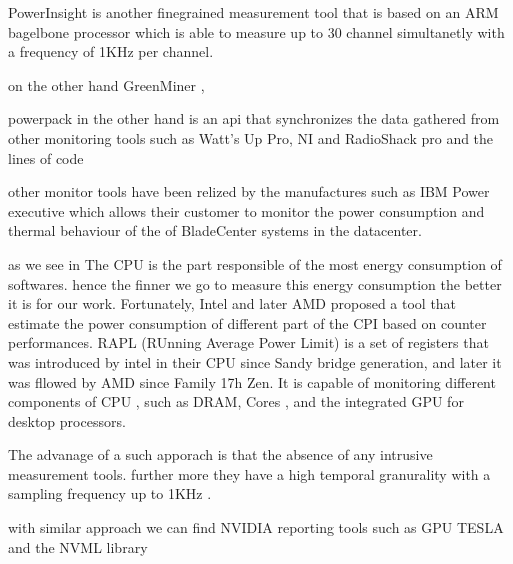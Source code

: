 PowerInsight \cite{laros2013powerinsight} is another finegrained measurement tool that is based on an ARM bagelbone processor \cite{coley2012beaglebone} which is able to measure up to 30 channel simultanetly with a frequency of 1KHz per channel.

on the other hand GreenMiner \cite{hindle2014greenminer}, %

powerpack \cite{ge2009powerpack} in the other hand is an api that synchronizes the data gathered from other monitoring tools such as Watt’s Up Pro, NI and RadioShack pro and the lines of code %

other monitor tools have been relized by the manufactures such as IBM Power executive \cite{koomey2011growth} which allows their customer to monitor the power consumption and thermal behaviour of the of BladeCenter systems in the datacenter.




as we see in %
The CPU is the part responsible of the most energy consumption of softwares. hence the finner we go to measure this energy consumption the better it is for our work.
Fortunately, Intel and later AMD proposed a tool that estimate the power consumption of different part of the CPI based on counter performances. RAPL (RUnning Average Power Limit) \cite{hackenberg2013power} \cite{hackenberg2015energy} is a set of registers that was introduced by intel in their CPU since Sandy bridge generation, and later it was fllowed by AMD since Family 17h Zen.
It is capable of monitoring different components of CPU , such as DRAM, Cores , and the integrated GPU for desktop processors.


The advanage of a such apporach is that the absence of any intrusive measurement tools. further more they have a high temporal granurality with a sampling frequency up to 1KHz \cite{ilsche_power_2015}.

with similar approach we can find NVIDIA reporting tools such as GPU TESLA \cite{burtscher2014measuring} and the NVML library \cite{fahad2019comparative}


